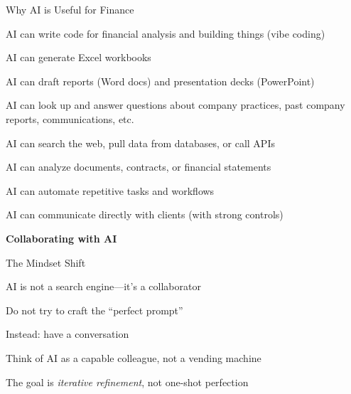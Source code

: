 \documentclass[aspectratio=169]{beamer}
\begin{document}
\begin{frame}{Why AI is Useful for Finance}
\begin{baritemize}
  \item AI can write code for financial analysis and building things (vibe coding)
  \item AI can generate Excel workbooks
  \item AI can draft reports (Word docs) and presentation decks (PowerPoint)
  \item AI can look up and answer questions about company practices, past company reports, communications, etc.
  \item AI can search the web, pull data from databases, or call APIs
  \item AI can analyze documents, contracts, or financial statements
  \item AI can automate repetitive tasks and workflows
  \item AI can communicate directly with clients (with strong controls)
\end{baritemize}
\end{frame}





\begin{frame}[plain]
\vfill
\begin{center}
{\fontsize{26}{30}\selectfont\bfseries\color{titlegray} Collaborating with AI}
\end{center}
\vfill
\end{frame}

\begin{frame}{The Mindset Shift}
\begin{baritemize}
  \item AI is not a search engine---it's a \alert{collaborator}
  \item Do not try to craft the ``perfect prompt''
  \item Instead: have a \alert{conversation}
  \item Think of AI as a capable colleague, not a vending machine
  \item The goal is \textit{iterative refinement}, not one-shot perfection
\end{baritemize}
\end{frame}
\end{document}
